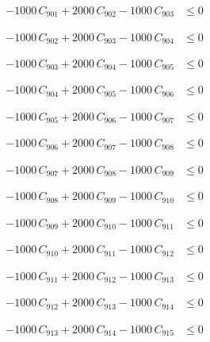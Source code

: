 \documentclass[a4paper,11pt]{article}
\begin{document}
\begin{align}
-1000\,C_{901} + 2000\,C_{902} - 1000\,C_{903} &\leq 0 \nonumber
\end{align}

\begin{align}
-1000\,C_{902} + 2000\,C_{903} - 1000\,C_{904} &\leq 0 \nonumber
\end{align}

\begin{align}
-1000\,C_{903} + 2000\,C_{904} - 1000\,C_{905} &\leq 0 \nonumber
\end{align}

\begin{align}
-1000\,C_{904} + 2000\,C_{905} - 1000\,C_{906} &\leq 0 \nonumber
\end{align}

\begin{align}
-1000\,C_{905} + 2000\,C_{906} - 1000\,C_{907} &\leq 0 \nonumber
\end{align}

\begin{align}
-1000\,C_{906} + 2000\,C_{907} - 1000\,C_{908} &\leq 0 \nonumber
\end{align}

\begin{align}
-1000\,C_{907} + 2000\,C_{908} - 1000\,C_{909} &\leq 0 \nonumber
\end{align}

\begin{align}
-1000\,C_{908} + 2000\,C_{909} - 1000\,C_{910} &\leq 0 \nonumber
\end{align}

\begin{align}
-1000\,C_{909} + 2000\,C_{910} - 1000\,C_{911} &\leq 0 \nonumber
\end{align}

\begin{align}
-1000\,C_{910} + 2000\,C_{911} - 1000\,C_{912} &\leq 0 \nonumber
\end{align}

\begin{align}
-1000\,C_{911} + 2000\,C_{912} - 1000\,C_{913} &\leq 0 \nonumber
\end{align}

\begin{align}
-1000\,C_{912} + 2000\,C_{913} - 1000\,C_{914} &\leq 0 \nonumber
\end{align}

\begin{align}
-1000\,C_{913} + 2000\,C_{914} - 1000\,C_{915} &\leq 0 \nonumber
\end{align}
\end{document}
